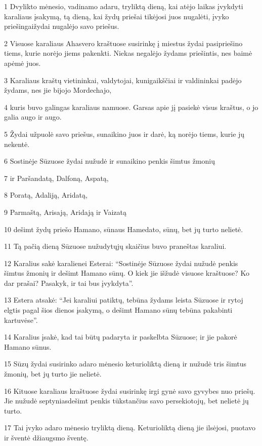 \par 1 Dvylikto mėnesio, vadinamo adaru, tryliktą dieną, kai atėjo laikas įvykdyti karaliaus įsakymą, tą dieną, kai žydų priešai tikėjosi juos nugalėti, įvyko priešingai­žydai nugalėjo savo priešus. 
\par 2 Visuose karaliaus Ahasvero kraštuose susirinkę į miestus žydai pasipriešino tiems, kurie norėjo jiems pakenkti. Niekas negalėjo žydams priešintis, nes baimė apėmė juos. 
\par 3 Karaliaus kraštų vietininkai, valdytojai, kunigaikščiai ir valdininkai padėjo žydams, nes jie bijojo Mordechajo, 
\par 4 kuris buvo galingas karaliaus namuose. Garsas apie jį pasiekė visus kraštus, o jo galia augo ir augo. 
\par 5 Žydai užpuolė savo priešus, sunaikino juos ir darė, ką norėjo tiems, kurie jų nekentė. 
\par 6 Sostinėje Sūzuose žydai nužudė ir sunaikino penkis šimtus žmonių 
\par 7 ir Paršandatą, Dalfoną, Aspatą, 
\par 8 Poratą, Adaliją, Aridatą, 
\par 9 Parmaštą, Arisają, Aridają ir Vaizatą­ 
\par 10 dešimt žydų priešo Hamano, sūnaus Hamedato, sūnų, bet jų turto nelietė. 
\par 11 Tą pačią dieną Sūzuose nužudytųjų skaičius buvo praneštas karaliui. 
\par 12 Karalius sakė karalienei Esterai: “Sostinėje Sūzuose žydai nužudė penkis šimtus žmonių ir dešimt Hamano sūnų. O kiek jie išžudė visuose kraštuose? Ko dar prašai? Pasakyk, ir tai bus įvykdyta”. 
\par 13 Estera atsakė: “Jei karaliui patiktų, tebūna žydams leista Sūzuose ir rytoj elgtis pagal šios dienos įsakymą, o dešimt Hamano sūnų tebūna pakabinti kartuvėse”. 
\par 14 Karalius įsakė, kad tai būtų padaryta ir paskelbta Sūzuose; ir jie pakorė Hamano sūnus. 
\par 15 Sūzų žydai susirinko adaro mėnesio keturioliktą dieną ir nužudė tris šimtus žmonių, bet jų turto jie nelietė. 
\par 16 Kituose karaliaus kraštuose žydai susirinkę irgi gynė savo gyvybes nuo priešų. Jie nužudė septyniasdešimt penkis tūkstančius savo persekiotojų, bet nelietė jų turto. 
\par 17 Tai įvyko adaro mėnesio tryliktą dieną. Keturioliktą dieną jie ilsėjosi, puotavo ir šventė džiaugsmo šventę. 
